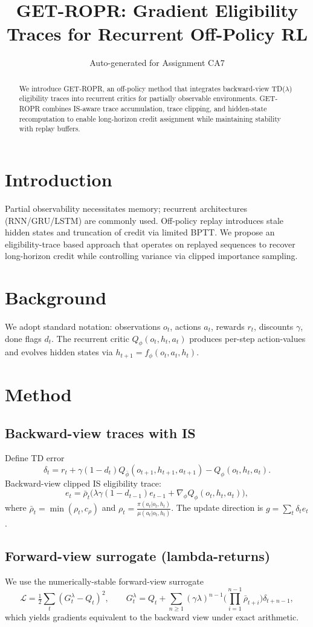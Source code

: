 \documentclass[twocolumn]{article}
\title{GET-ROPR: Gradient Eligibility Traces for Recurrent Off-Policy RL}
\author{Auto-generated for Assignment CA7}
\begin{document}
\maketitle
\begin{abstract}
We introduce GET-ROPR, an off-policy method that integrates backward-view
TD($\lambda$) eligibility traces into recurrent critics for partially observable
environments. GET-ROPR combines IS-aware trace accumulation, trace clipping,
and hidden-state recomputation to enable long-horizon credit assignment while
maintaining stability with replay buffers.
\end{abstract}

\section{Introduction}
Partial observability necessitates memory; recurrent architectures (RNN/GRU/LSTM)
are commonly used. Off-policy replay introduces stale hidden states and truncation
of credit via limited BPTT. We propose an eligibility-trace based approach that
operates on replayed sequences to recover long-horizon credit while controlling
variance via clipped importance sampling.

\section{Background}
We adopt standard notation: observations \(o_t\), actions \(a_t\), rewards \(r_t\),
discounts \(\gamma\), done flags \(d_t\). The recurrent critic \(Q_\phi(o_t,h_t,a_t)\)
produces per-step action-values and evolves hidden states via \(h_{t+1}=f_\phi(o_t,a_t,h_t)\).

\section{Method}
\subsection{Backward-view traces with IS}
Define TD error
\[
\delta_t = r_t + \gamma(1-d_t)Q_{\bar\phi}(o_{t+1},h_{t+1},a_{t+1}) - Q_\phi(o_t,h_t,a_t).
\]
Backward-view clipped IS eligibility trace:
\[
e_t = \bar{\rho}_t\big(\lambda\gamma(1-d_{t-1})e_{t-1} + \nabla_\phi Q_\phi(o_t,h_t,a_t)\big),
\]
where \(\bar{\rho}_t=\min(\rho_t,c_\rho)\) and \(\rho_t=\frac{\pi(a_t|o_t,h_t)}{\mu(a_t|o_t,h_t)}\).
The update direction is \(g=\sum_t \delta_t e_t\).

\subsection{Forward-view surrogate (lambda-returns)}
We use the numerically-stable forward-view surrogate
\[
\mathcal{L}=\tfrac12\sum_t (G_t^\lambda - Q_t)^2,\qquad
G_t^\lambda = Q_t + \sum_{n\ge1} (\gamma\lambda)^{n-1}\Big(\prod_{i=1}^{n-1}\bar{\rho}_{t+i}\Big)\delta_{t+n-1},
\]
which yields gradients equivalent to the backward view under exact arithmetic.
\end{document}
